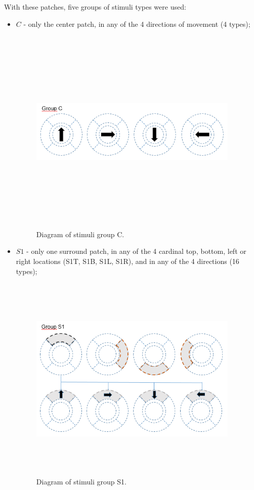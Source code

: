 With these patches, five groups of stimuli types were used:
\begin{itemize}
\item $C$ - only the center patch, in any of the 4 directions of movement (4 types);

\begin{figure}[h]\centering \includegraphics[width=10cm,height=10cm,keepaspectratio]{Figures/4.Chapter/C.PNG} \caption{Diagram of stimuli group C.} \end{figure}

\item $S1$ - only one surround patch, in any of the 4 cardinal top, bottom, left or right locations (S1T, S1B, S1L, S1R), and in any of the 4 directions (16 types);

\begin{figure}[h]\centering \includegraphics[width=10cm,height=10cm,keepaspectratio]{Figures/4.Chapter/S1.PNG} \caption{Diagram of stimuli group S1.} \end{figure}


\end{itemize}
